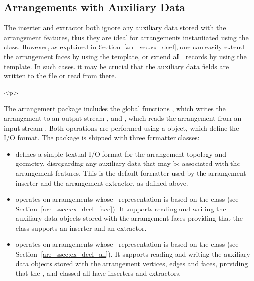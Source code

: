 \begin{ccAdvanced}
\subsection{Arrangements with Auxiliary Data}
\label{arr_ssec:arr_io_aux_data}
%
The inserter and extractor both ignore any auxiliary data stored with
the arrangement features, thus they are ideal for arrangements
instantiated using the  class.
However, as explained in Section~\ref{arr_sec:ex_dcel}, one can easily
extend the arrangement faces by using the 
template, or extend all \dcel\ records by using the 
template. In such cases, it may be crucial that the auxiliary data fields
are written to the file or read from there.

\begin{ccHtmlOnly}<p>\end{ccHtmlOnly}
The arrangement package includes the global functions
, which writes the arrangement 
to an output stream , and , which
reads the arrangement  from an input stream . Both
operations are performed using a  object, which define
the I/O format. The package is shipped with three formatter classes:
\begin{itemize}
\item {} defines a simple textual
I/O format for the arrangement topology and geometry, disregarding any
auxiliary data that may be associated with the arrangement features.
This is the default formatter used by the arrangement inserter and the
arrangement extractor, as defined above.
%
\item {} operates on
arrangements whose \dcel\ representation is based on the
 class (see
Section~\ref{arr_ssec:ex_dcel_face}). It supports reading and writing
the auxiliary data objects stored with the arrangement faces providing
that the  class supports an inserter and an extractor.
%
\item {} operates on
arrangements whose \dcel\ representation is based on the
 class
(see Section~\ref{arr_ssec:ex_dcel_all}). It supports reading and writing
the auxiliary data objects stored with the arrangement vertices, edges
and faces, providing that the ,  and
 classed all have inserters and extractors.
\end{itemize}


\end{ccAdvanced}
